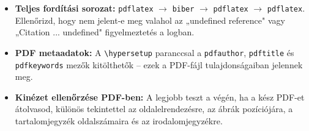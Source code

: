 \begin{itemize}[noitemsep]
  \item \textbf{Teljes fordítási sorozat:} \texttt{pdflatex} $\to$
        \texttt{biber} $\to$ \texttt{pdflatex} $\to$ \texttt{pdflatex}.
        Ellenőrizd, hogy nem jelent-e meg valahol az „undefined reference"
        vagy „Citation ... undefined" figyelmeztetés a logban.
  \item \textbf{PDF metaadatok:} A \verb|\hypersetup| paranccsal a
        \texttt{pdfauthor}, \texttt{pdftitle} és \texttt{pdfkeywords} mezők
        kitölthetők -- ezek a PDF-fájl tulajdonságaiban jelennek meg.
  \item \textbf{Kinézet ellenőrzése PDF-ben:} A legjobb teszt a végén, ha a
        kész PDF-et átolvasod, különös tekintettel az oldalelrendezésre, az
        ábrák pozíciójára, a tartalomjegyzék oldalszámaira és az
        irodalomjegyzékre.
\end{itemize}
